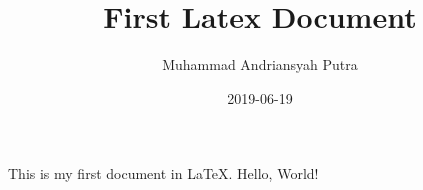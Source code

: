 \documentclass{article}
\title{First Latex Document}
\date{2019-06-19}
\author{Muhammad Andriansyah Putra}
\begin{document}
  \maketitle
  \newpage

  This is my first document in \LaTeX.
  Hello, World!
\end{document}
